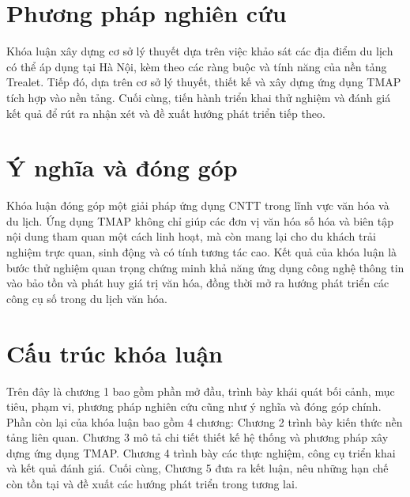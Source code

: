 \section{Phương pháp nghiên cứu}
Khóa luận xây dựng cơ sở lý thuyết dựa trên việc khảo sát các địa điểm du lịch có thể áp dụng tại Hà Nội, kèm theo các ràng buộc và tính năng của nền tảng Trealet. Tiếp đó, dựa trên cơ sở lý thuyết, thiết kế và xây dựng ứng dụng TMAP tích hợp vào nền tảng. Cuối cùng, tiến hành triển khai thử nghiệm và đánh giá kết quả để rút ra nhận xét và đề xuất hướng phát triển tiếp theo.  

\section{Ý nghĩa và đóng góp}
Khóa luận đóng góp một giải pháp ứng dụng CNTT trong lĩnh vực văn hóa và du lịch. Ứng dụng TMAP không chỉ giúp các đơn vị văn hóa số hóa và biên tập nội dung tham quan một cách linh hoạt, mà còn mang lại cho du khách trải nghiệm trực quan, sinh động và có tính tương tác cao. Kết quả của khóa luận là bước thử nghiệm quan trọng chứng minh khả năng ứng dụng công nghệ thông tin vào bảo tồn và phát huy giá trị văn hóa, đồng thời mở ra hướng phát triển các công cụ số trong du lịch văn hóa.  

\section{Cấu trúc khóa luận}

Trên đây là chương 1 bao gồm phần mở đầu, trình bày khái quát bối cảnh, mục tiêu, phạm vi, phương pháp nghiên cứu cũng như ý nghĩa và đóng góp chính. Phần còn lại của khóa luận bao gồm 4 chương: Chương 2 trình bày kiến thức nền tảng liên quan. Chương 3 mô tả chi tiết thiết kế hệ thống và phương pháp xây dựng ứng dụng TMAP. Chương 4 trình bày các thực nghiệm, công cụ triển khai và kết quả đánh giá. Cuối cùng, Chương 5 đưa ra kết luận, nêu những hạn chế còn tồn tại và đề xuất các hướng phát triển trong tương lai.
